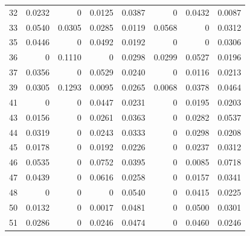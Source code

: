 \begin{table}[H]
\begin{tabular}{rrrrrrrr}
32 & 0.0232 & 0 & 0.0125 & 0.0387 & 0 & 0.0432 & 0.0087 \\
33 & 0.0540 & 0.0305 & 0.0285 & 0.0119 & 0.0568 & 0 & 0.0312 \\
35 & 0.0446 & 0 & 0.0492 & 0.0192 & 0 & 0 & 0.0306 \\
36 & 0 & 0.1110 & 0 & 0.0298 & 0.0299 & 0.0527 & 0.0196 \\
37 & 0.0356 & 0 & 0.0529 & 0.0240 & 0 & 0.0116 & 0.0213 \\
39 & 0.0305 & 0.1293 & 0.0095 & 0.0265 & 0.0068 & 0.0378 & 0.0464 \\
41 & 0 & 0 & 0.0447 & 0.0231 & 0 & 0.0195 & 0.0203 \\
43 & 0.0156 & 0 & 0.0261 & 0.0363 & 0 & 0.0282 & 0.0537 \\
44 & 0.0319 & 0 & 0.0243 & 0.0333 & 0 & 0.0298 & 0.0208 \\
45 & 0.0178 & 0 & 0.0192 & 0.0226 & 0 & 0.0237 & 0.0312 \\
46 & 0.0535 & 0 & 0.0752 & 0.0395 & 0 & 0.0085 & 0.0718 \\
47 & 0.0439 & 0 & 0.0616 & 0.0258 & 0 & 0.0157 & 0.0341 \\
48 & 0 & 0 & 0 & 0.0540 & 0 & 0.0415 & 0.0225 \\
50 & 0.0132 & 0 & 0.0017 & 0.0481 & 0 & 0.0500 & 0.0301 \\
51 & 0.0286 & 0 & 0.0246 & 0.0474 & 0 & 0.0460 & 0.0246 \\
\bottomrule
\end{tabular}
\end{table}

